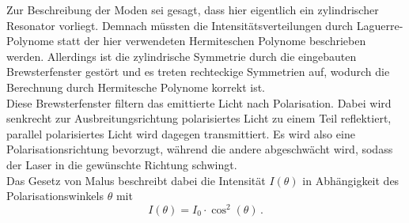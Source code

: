 Zur Beschreibung der Moden sei gesagt, dass hier eigentlich ein zylindrischer Resonator vorliegt. 
Demnach müssten die Intensitätsverteilungen durch Laguerre-Polynome statt der hier verwendeten Hermiteschen Polynome beschrieben werden. 
Allerdings ist die zylindrische Symmetrie durch die eingebauten Brewsterfenster gestört und es treten rechteckige Symmetrien auf, wodurch die Berechnung durch Hermitesche Polynome korrekt ist. \\
Diese Brewsterfenster filtern das emittierte Licht nach Polarisation. 
Dabei wird senkrecht zur Ausbreitungsrichtung polarisiertes Licht zu einem Teil reflektiert, parallel polarisiertes Licht wird dagegen transmittiert.
Es wird also eine Polarisationsrichtung bevorzugt, während die andere abgeschwächt wird, sodass der Laser in die gewünschte Richtung schwingt.  \\
Das Gesetz von Malus beschreibt dabei die Intensität $I(\theta)$ in Abhängigkeit des Polarisationswinkels $\theta$ mit 
\begin{equation}
    I(\theta) = I_0 \cdot \cos^2(\theta) \,.
    \label{eq:malus}
\end{equation}





